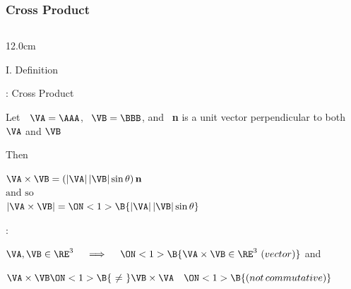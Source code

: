 \begin{frame}
\frametitle{Cross Product}
\begin{columns}
\begin{column}{12.0cm}

{I. Definition}

\vspace{0.2cm}

\scriptsize
	
: Cross Product

\vspace{0.3cm}

Let \,\, $\VA = \AAA$, \, $\VB = \BBB$, and \, {\bf n} is a unit vector perpendicular to both $\VA$ and $\VB$

\vspace{0.3cm}

Then 
\begin{center}
	$\VA \times \VB = (|\VA|\,|\VB|\sin \theta) \, {\bf n}$ \\
	\vspace{0.2cm}
	$\text{and so}$\\
	\vspace{0.2cm}
	$|\VA \times \VB| = \ON<1>{\B{|\VA|\,|\VB|\sin \theta}}$
\end{center}

\vspace{0.2cm}

:

\vspace{0.1cm}

\OBUL $\VA,\VB \in \RE^3 \quad \implies \quad 
\ON<1>{\B{\VA \times \VB \in \RE^3 \,\, (vector)}}$ and \,\,
\\

\vspace{0.2cm}

\OBUL $\VA \times \VB 
\ON<1>{\B{\,\,\ne\,\,}} \VB \times \VA \quad 
\ON<1>{\B{(not \, commutative)}}$ 

\vspace{0.2cm}


\end{column}
\end{columns}
\end{frame}
